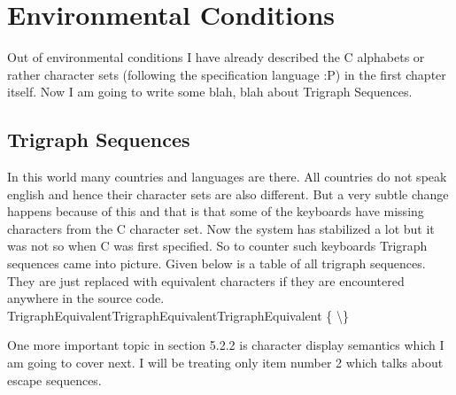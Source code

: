 \section{Environmental Conditions}
Out of environmental conditions I have already described the C
alphabets or rather character sets (following the specification
language :P) in the first chapter itself. Now I am going to write some
blah, blah about Trigraph Sequences.

\subsection{Trigraph Sequences}
In this world many countries and languages are there. All countries do
not speak english and hence their character sets are also
different. But a very subtle change happens because of this and that is
that some of the keyboards have missing characters from the C
character set. Now the system has stabilized a lot but it was not so
when C was first specified. So to counter such keyboards Trigraph
sequences came into picture. Given below is a table of all trigraph
sequences. They are just replaced with equivalent characters if they
are encountered anywhere in the source code.
{\starttable[|c|c|c|c|c|c|]
\HL
\VL Trigraph\VL Equivalent\VL Trigraph\VL Equivalent\VL Trigraph\VL Equivalent\VL\SR
\HL
\VL{}\VL\type{#}\VL{}\VL\type{^}\VL{}\VL\type{|}\VL\SR
\HL
\VL {}\VL\type{[}\VL{}\VL\type{]}\VL {}\VL\{\VL\MR
\HL
\VL {}\VL\backslash\VL{}\VL\}\VL{}\VL\type{~}\VL\LR
\HL
\stoptable}

One more important topic in section 5.2.2 is character display
semantics which I am going to cover next. I will be treating only item
number 2 which talks about escape sequences.
